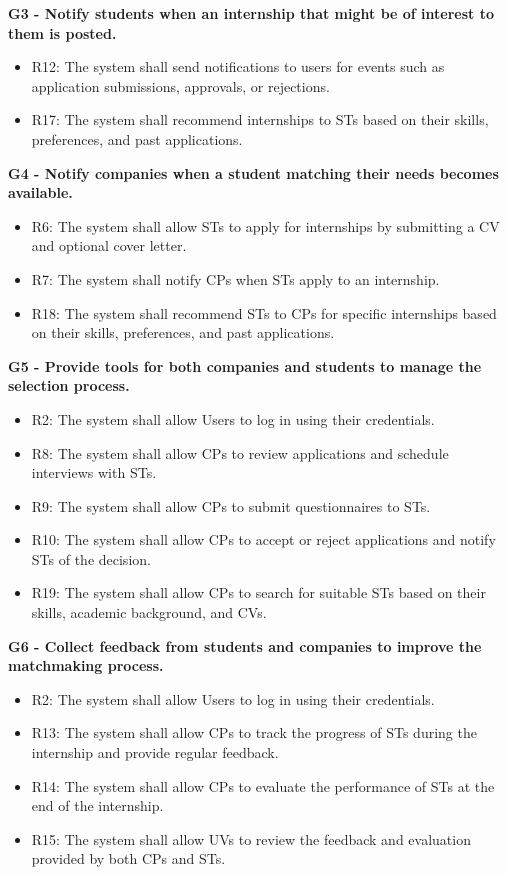 \vspace{1.5cm}
\textbf{G3 - Notify students when an internship that might be of interest to them is posted.}
\begin{itemize}
    \item R12: The system shall send notifications to users for events such as application submissions, approvals, or rejections.
    \item R17: The system shall recommend internships to STs based on their skills, preferences, and past applications.
\end{itemize}

\vspace{1.5cm}
\textbf{G4 - Notify companies when a student matching their needs becomes available.}
\begin{itemize}
    \item R6: The system shall allow STs to apply for internships by submitting a CV and optional cover letter.
    \item R7: The system shall notify CPs when STs apply to an internship.
    \item R18: The system shall recommend STs to CPs for specific internships based on their skills, preferences, and past applications.
\end{itemize}

\vspace{1.5cm}
\textbf{G5 - Provide tools for both companies and students to manage the selection process.}
\begin{itemize}
    \item R2: The system shall allow Users to log in using their credentials.
    \item R8: The system shall allow CPs to review applications and schedule interviews with STs.
    \item R9: The system shall allow CPs to submit questionnaires to STs.
    \item R10: The system shall allow CPs to accept or reject applications and notify STs of the decision.
    \item R19: The system shall allow CPs to search for suitable STs based on their skills, academic background, and CVs.
\end{itemize}

\vspace{1.5cm}
\textbf{G6 - Collect feedback from students and companies to improve the matchmaking process.}
\begin{itemize}
    \item R2: The system shall allow Users to log in using their credentials.
    \item R13: The system shall allow CPs to track the progress of STs during the internship and provide regular feedback.
    \item R14: The system shall allow CPs to evaluate the performance of STs at the end of the internship.
    \item R15: The system shall allow UVs to review the feedback and evaluation provided by both CPs and STs.
\end{itemize}

